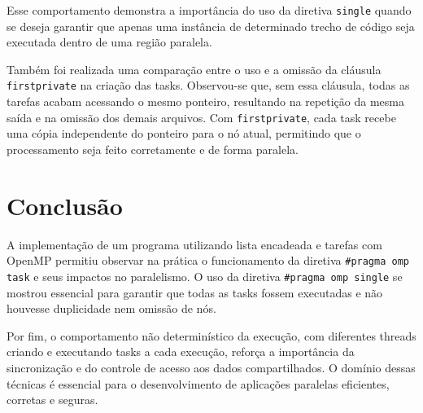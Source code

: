 \documentclass[a4paper, 12pt]{article}
\begin{document}
	Esse comportamento demonstra a importância do uso da diretiva \texttt{single} quando se deseja garantir que apenas uma instância de determinado trecho de código seja executada dentro de uma região paralela.
	
	Também foi realizada uma comparação entre o uso e a omissão da cláusula \texttt{firstprivate} na criação das tasks. Observou-se que, sem essa cláusula, todas as tarefas acabam acessando o mesmo ponteiro, resultando na repetição da mesma saída e na omissão dos demais arquivos. Com \texttt{firstprivate}, cada task recebe uma cópia independente do ponteiro para o nó atual, permitindo que o processamento seja feito corretamente e de forma paralela.
	
	\section{Conclusão}
	
	\hspace{0.7cm}A implementação de um programa utilizando lista encadeada e tarefas com OpenMP permitiu observar na prática o funcionamento da diretiva \texttt{\#pragma omp task} e seus impactos no paralelismo. O uso da diretiva \texttt{\#pragma omp single} se mostrou essencial para garantir que todas as tasks fossem executadas e não houvesse duplicidade nem omissão de nós.
	
	Por fim, o comportamento não determinístico da execução, com diferentes threads criando e executando tasks a cada execução, reforça a importância da sincronização e do controle de acesso aos dados compartilhados. O domínio dessas técnicas é essencial para o desenvolvimento de aplicações paralelas eficientes, corretas e seguras.
	
	
	
	
	
\end{document}
